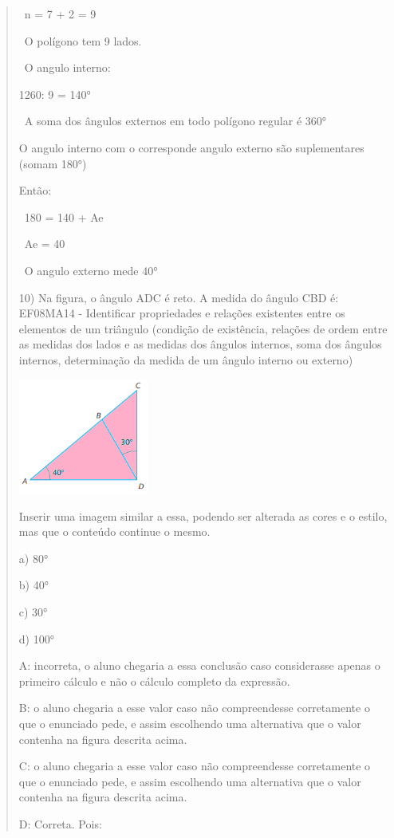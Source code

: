 \begin{quote}
\begin{escolha}
~n = 7 + 2 = 9

~O polígono tem 9 lados.

~O angulo interno:

1260: 9 = 140°

~A soma dos ângulos externos em todo polígono regular é 360°

O angulo interno com o corresponde angulo externo são suplementares
(somam 180°)

Então:

~180 = 140 + Ae

~Ae = 40

~O angulo externo mede 40°

10) Na figura, o ângulo ADC é reto. A medida do ângulo CBD é: EF08MA14 -
Identificar propriedades e relações existentes entre os elementos de um
triângulo (condição de existência, relações de ordem entre as medidas
dos lados e as medidas dos ângulos internos, soma dos ângulos internos,
determinação da medida de um ângulo interno ou externo)

\includegraphics[width=1.68333in,height=1.49462in]{./imgSAEB_8_MAT/media/image62.png}

Inserir uma imagem similar a essa, podendo ser alterada as cores e o
estilo, mas que o conteúdo continue o mesmo.

a) 80°

b) 40°

c) 30°

d) 100°

A: incorreta, o aluno chegaria a essa conclusão caso considerasse apenas
o primeiro cálculo e não o cálculo completo da expressão.

B: o aluno chegaria a esse valor caso não compreendesse corretamente o
que o enunciado pede, e assim escolhendo uma alternativa que o valor
contenha na figura descrita acima.

C: o aluno chegaria a esse valor caso não compreendesse corretamente o
que o enunciado pede, e assim escolhendo uma alternativa que o valor
contenha na figura descrita acima.

D: Correta. Pois:


\end{escolha}
\end{quote}
